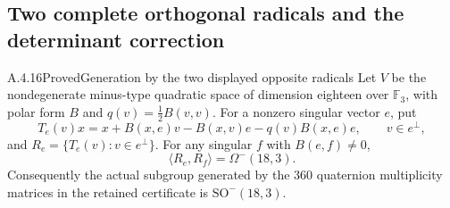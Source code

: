 \subsection{Two complete orthogonal radicals and the determinant correction}

\begin{result}{A.4.16}{Proved}{Generation by the two displayed opposite radicals}
\label{lem:two-orthogonal-radicals}
Let \(V\) be the nondegenerate minus-type quadratic
space of dimension eighteen over \(\mathbb F_3\),
with polar form \(B\) and
\(q(v)=\tfrac12 B(v,v)\).
For a nonzero singular vector \(e\), put
\[
 T_e(v)x=x+B(x,e)v-B(x,v)e-q(v)B(x,e)e,
 \qquad v\in e^\perp,
 \tag{OG.1}
\]
and \(R_e=\{T_e(v):v\in e^\perp\}\).
For any singular \(f\) with \(B(e,f)\ne0\),
\[
                 \langle R_e,R_f\rangle=\Omega^-(18,3).
 \tag{OG.2}
\]
Consequently the actual subgroup generated by the
\(360\) quaternion multiplicity matrices in the
retained certificate is \(\mathrm{SO}^-(18,3)\).
\end{result}
